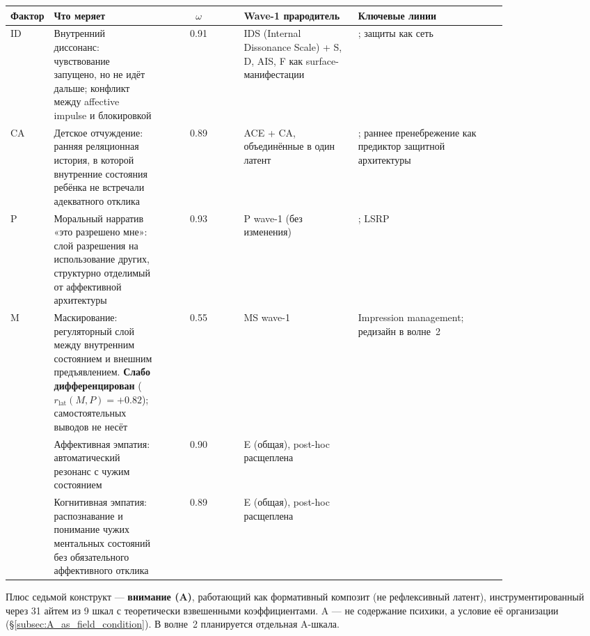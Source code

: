 \begin{center}
\small
\begin{tabular}{p{0.08\linewidth}p{0.22\linewidth}cp{0.23\linewidth}p{0.30\linewidth}}
\toprule
\textbf{Фактор} & \textbf{Что меряет} & \boldmath$\omega$ & \textbf{Wave-1 прародитель} & \textbf{Ключевые линии} \\
\midrule
ID & Внутренний диссонанс: чувствование запущено, но не идёт дальше; конфликт между affective impulse и блокировкой & 0.91 & IDS (Internal Dissonance Scale) + S, D, AIS, F как surface-манифестации & \citet{ferenczi1933, klein1946, fonagy2002}; защиты как сеть \citep{digiuseppe2024} \\
\midrule
CA & Детское отчуждение: ранняя реляционная история, в которой внутренние состояния ребёнка не встречали адекватного отклика & 0.89 & ACE + CA, объединённые в один латент & \citet{bowlby1969, main1986, fonagy2002}; раннее пренебрежение как предиктор защитной архитектуры \\
\midrule
P & Моральный нарратив «это разрешено мне»: слой разрешения на использование других, структурно отделимый от аффективной архитектуры & 0.93 & P wave-1 (без изменения) & \citet{cleckley1941, hare1991, blair2013, baroncohen2011}; LSRP \citep{levenson1995} \\
\midrule
M & Маскирование: регуляторный слой между внутренним состоянием и внешним предъявлением. \textbf{Слабо дифференцирован} ($r_{\mathrm{lat}}(M, P) = +0.82$); самостоятельных выводов не несёт & 0.55 & MS wave-1 & Impression management; редизайн в волне~2 \\
\midrule
\EAF{} & Аффективная эмпатия: автоматический резонанс с чужим состоянием & 0.90 & E (общая), post-hoc расщеплена & \citet{davis1983, shamaytsoory2011, decety2011} \\
\midrule
\Ecog{} & Когнитивная эмпатия: распознавание и понимание чужих ментальных состояний без обязательного аффективного отклика & 0.89 & E (общая), post-hoc расщеплена & \citet{baroncohen2011, shamaytsoory2011} \\
\bottomrule
\end{tabular}
\end{center}

Плюс седьмой конструкт --- \textbf{внимание (A)}, работающий как формативный композит (не рефлексивный латент), инструментированный через 31 айтем из 9 шкал с теоретически взвешенными коэффициентами. A --- не содержание психики, а условие её организации (§\ref{subsec:A_as_field_condition}). В волне~2 планируется отдельная A-шкала.

